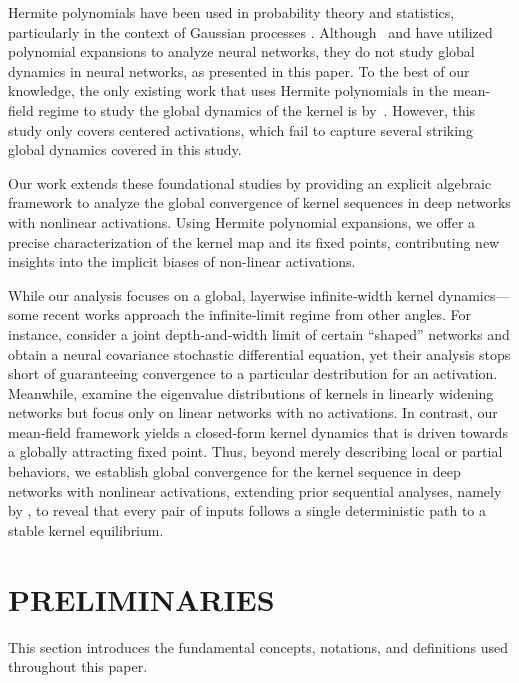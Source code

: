 \documentclass[twoside]{article}
\theoremstyle{definition}
\begin{document}
Hermite polynomials have been used in probability theory and statistics, particularly in the context of Gaussian processes \citep{williams2006gaussian}. Although~\citet{poole2016exponential} and \citet{daniely2016toward} have utilized polynomial expansions to analyze neural networks, they do not study global dynamics in neural networks, as presented in this paper. To the best of our knowledge, the only existing work that uses Hermite polynomials in the mean-field regime to study the global dynamics of the kernel is by~\citet{joudaki2023impact}. However, this study only covers centered activations, which fail to capture several striking global dynamics covered in this study.

Our work extends these foundational studies by providing an explicit algebraic framework to analyze the global convergence of kernel sequences in deep networks with nonlinear activations. Using Hermite polynomial expansions, we offer a precise characterization of the kernel map and its fixed points, contributing new insights into the implicit biases of non-linear activations.

While our analysis focuses on a global, layerwise infinite‐width kernel dynamics—some recent works approach the infinite‐limit regime from other angles. 
For instance, \citet{li2022neural} consider a joint depth‐and‐width limit of certain ``shaped'' networks and obtain a neural covariance stochastic differential equation, yet their analysis stops short of guaranteeing convergence to a particular destribution for an activation. 
Meanwhile, \citet{fan2020spectra} examine the eigenvalue distributions of kernels in linearly widening networks but focus only on linear networks with no activations.
In contrast, our mean‐field framework yields a closed‐form kernel dynamics that is driven towards a globally attracting fixed point. 
Thus, beyond merely describing local or partial behaviors, we establish global convergence for the kernel sequence in deep networks with nonlinear activations, extending prior sequential analyses, namely by \citet{yang2019meanfield}, to reveal that every pair of inputs follows a single deterministic path to a stable kernel equilibrium.


\section{PRELIMINARIES}
This section introduces the fundamental concepts, notations, and definitions used throughout this paper. 
\end{document}
